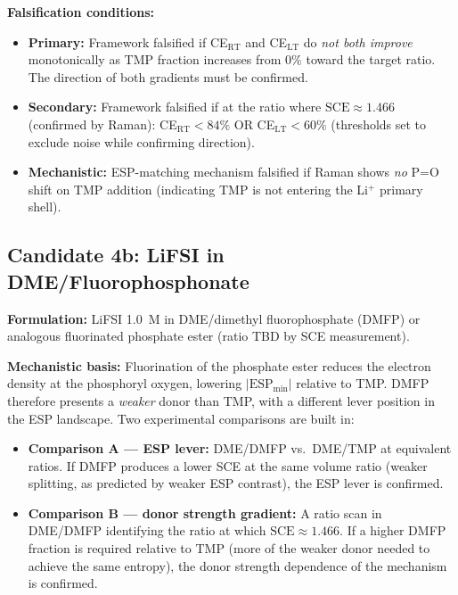 \documentclass[11pt]{article}
\theoremstyle{plain}
\theoremstyle{definition}
\theoremstyle{remark}
\begin{document}
\textbf{Falsification conditions:}
\begin{itemize}[leftmargin=2em]
  \item \textbf{Primary:} Framework falsified if CE$_{\mathrm{RT}}$ and
        CE$_{\mathrm{LT}}$ do \emph{not both improve} monotonically as TMP
        fraction increases from 0\% toward the target ratio.
        The direction of both gradients must be confirmed.
  \item \textbf{Secondary:} Framework falsified if at the ratio where
        $\mathrm{SCE} \approx 1.466$ (confirmed by Raman):
        CE$_{\mathrm{RT}} < 84\%$ OR CE$_{\mathrm{LT}} < 60\%$
        (thresholds set to exclude noise while confirming direction).
  \item \textbf{Mechanistic:} ESP-matching mechanism falsified if Raman
        shows \emph{no} P=O shift on TMP addition (indicating TMP is not
        entering the Li$^+$ primary shell).
\end{itemize}

\subsection{Candidate 4b: LiFSI in DME/Fluorophosphonate}

\textbf{Formulation:} LiFSI 1.0~M in DME/dimethyl fluorophosphate
(DMFP) or analogous fluorinated phosphate ester (ratio TBD by SCE
measurement).

\textbf{Mechanistic basis:} Fluorination of the phosphate ester reduces
the electron density at the phosphoryl oxygen, lowering
$|\mathrm{ESP}_{\min}|$ relative to TMP.  DMFP therefore presents a
\emph{weaker} donor than TMP, with a different lever position in the
ESP landscape.  Two experimental comparisons are built in:
\begin{itemize}[leftmargin=2em]
  \item \textbf{Comparison A --- ESP lever:} DME/DMFP vs.\ DME/TMP at
        equivalent ratios.  If DMFP produces a lower SCE at the same
        volume ratio (weaker splitting, as predicted by weaker ESP
        contrast), the ESP lever is confirmed.
  \item \textbf{Comparison B --- donor strength gradient:} A ratio scan
        in DME/DMFP identifying the ratio at which
        $\mathrm{SCE} \approx 1.466$.  If a higher DMFP fraction is
        required relative to TMP (more of the weaker donor needed to
        achieve the same entropy), the donor strength dependence of the
        mechanism is confirmed.
\end{itemize}
\end{document}

